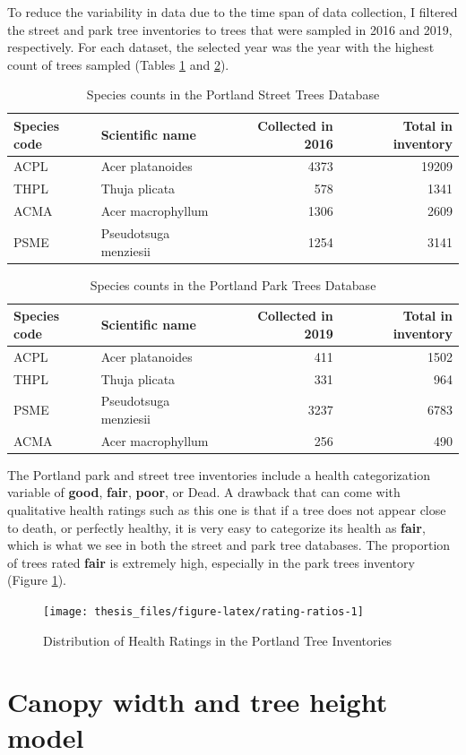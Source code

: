\documentclass[12pt,twoside]{reedthesis}
\begin{document}
To reduce the variability in data due to the time span of data
collection, I filtered the street and park tree inventories to trees
that were sampled in 2016 and 2019, respectively. For each dataset, the
selected year was the year with the highest count of trees sampled
(Tables \ref{tab:streettable} and \ref{tab:parktable}).
\begin{table}

\caption[Species counts in Street Trees Database]{\label{tab:streettable}Species counts in the Portland Street Trees Database}
\centering
\begin{tabular}[t]{llrr}
\toprule
Species code & Scientific name & Collected in 2016 & Total in inventory\\
\midrule
ACPL & Acer platanoides & 4373 & 19209\\
THPL & Thuja plicata & 578 & 1341\\
ACMA & Acer macrophyllum & 1306 & 2609\\
PSME & Pseudotsuga menziesii & 1254 & 3141\\
\bottomrule
\end{tabular}
\end{table}
\begin{table}

\caption[Species counts in Park Trees Database]{\label{tab:parktable}Species counts in the Portland Park Trees Database}
\centering
\begin{tabular}[t]{llrr}
\toprule
Species code & Scientific name & Collected in 2019 & Total in inventory\\
\midrule
ACPL & Acer platanoides & 411 & 1502\\
THPL & Thuja plicata & 331 & 964\\
PSME & Pseudotsuga menziesii & 3237 & 6783\\
ACMA & Acer macrophyllum & 256 & 490\\
\bottomrule
\end{tabular}
\end{table}
The Portland park and street tree inventories include a health
categorization variable of \textbf{good}, \textbf{fair}, \textbf{poor}, or Dead. A
drawback that can come with qualitative health ratings such as this one
is that if a tree does not appear close to death, or perfectly healthy,
it is very easy to categorize its health as \textbf{fair}, which is what we
see in both the street and park tree databases. The proportion of trees
rated \textbf{fair} is extremely high, especially in the park trees inventory
(Figure \ref{fig:rating-ratios}).
\begin{figure}

{\centering \texttt{[image: thesis\_files/figure-latex/rating-ratios-1]} 

}

\caption{Distribution of Health Ratings in the Portland Tree Inventories}\label{fig:rating-ratios}
\end{figure}
\hypertarget{canopy-width-and-tree-height-model}{%
\section{Canopy width and tree height model}\label{canopy-width-and-tree-height-model}}
\end{document}
